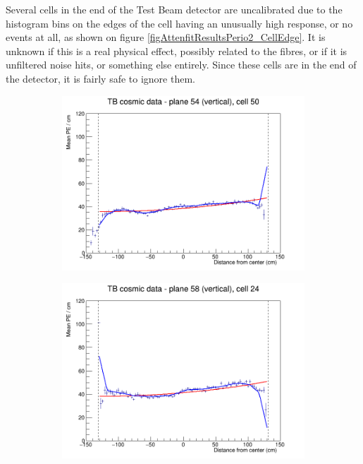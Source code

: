 \documentclass[12pt,a4paper]{article}
\begin{document}
Several cells in the end of the Test Beam detector are uncalibrated due to the histogram bins on the edges of the cell having an unusually high response, or no events at all, as shown on figure \ref{figAttenfitResultsPerio2_CellEdge}. It is unknown if this is a real physical effect, possibly related to the fibres, or if it is unfiltered noise hits, or something else entirely. Since these cells are in the end of the detector, it is fairly safe to ignore them.

\begin{figure}[h]
  \begin{subfigure}{0.5\textwidth}
    \includegraphics[width=\linewidth]{RelativeCalibrationResults/p2_054_050.png}
  \end{subfigure}
  \begin{subfigure}{0.5\textwidth}
    \includegraphics[width=\linewidth]{RelativeCalibrationResults/p2_058_024.png}

\end{subfigure}
\end{figure}
\end{document}
